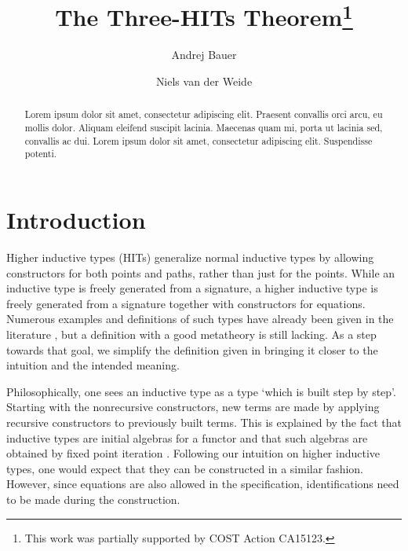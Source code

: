 \documentclass[a4paper,UKenglish]{lipics-v2016}
\title{The Three-HITs Theorem\footnote{This work was partially supported by COST Action CA15123.}}
\author[1]{Andrej Bauer}
\author[2]{Niels van der Weide}
\affil[1]{Faculty of Mathematics and Physics, University of Ljubljana, Ljubljana, Slovenia\\
  \texttt{Andrej.Bauer@andrej.com}}
\affil[2]{Department of Computer Science, Radboud University, Nijmegen, The Netherlands\\
  \texttt{nweide@cs.ru.nl}}
\begin{document}
\maketitle

\begin{abstract}
Lorem ipsum dolor sit amet, consectetur adipiscing elit. Praesent convallis orci arcu, eu mollis dolor. Aliquam eleifend suscipit lacinia. Maecenas quam mi, porta ut lacinia sed, convallis ac dui. Lorem ipsum dolor sit amet, consectetur adipiscing elit. Suspendisse potenti. 
 \end{abstract}

\section{Introduction}
Higher inductive types (HITs) generalize normal inductive types by allowing constructors for both points and paths, rather than just for the points.
While an inductive type is freely generated from a signature, a higher inductive type is freely generated from a signature together with constructors for equations.
Numerous examples and definitions of such types have already been given in the literature \cite{altenkirch2016quotient,awodey2012inductive,basoldhigher,sojakova2015higher,hottbook}, but a definition with a good metatheory is still lacking.
As a step towards that goal, we simplify the definition given in \cite{basoldhigher} bringing it closer to the intuition and the intended meaning.

Philosophically, one sees an inductive type as a type `which is built step by step'.
Starting with the nonrecursive constructors, new terms are made by applying recursive constructors to previously built terms.
This is explained by the fact that inductive types are initial algebras for a functor \cite{dybjer1994inductive,dybjer2003induction} and that such algebras are obtained by fixed point iteration \cite{adamek1974free}.
Following our intuition on higher inductive types, one would expect that they can be constructed in a similar fashion.
However, since equations are also allowed in the specification, identifications need to be made during the construction.
\end{document}
